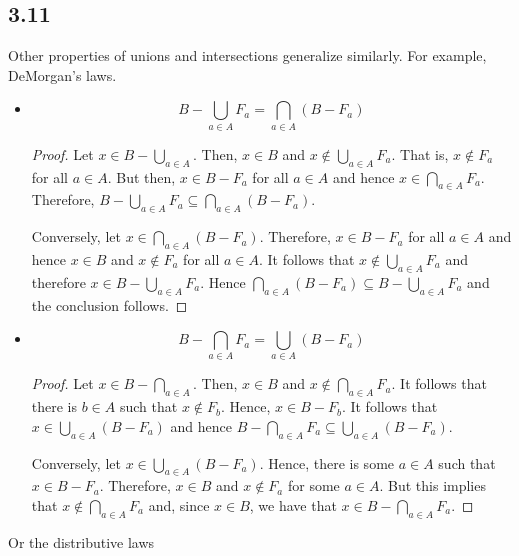 \subsection*{3.11} Other properties of unions and intersections generalize similarly. For example, DeMorgan's laws.

\begin{itemize}
    \item $$B - \bigcup_{a \in A} F_a = \bigcap_{a \in A} ( B - F_a) $$
    
    \begin{proof}
        

    Let $x \in B - \bigcup_{a \in A}$. Then, $x \in B$ and $x \notin \bigcup_{a \in A} F_a$. That is, $x \notin F_a$ for all $a \in A$. But then, $x \in B - F_a$ for all $a \in A$ and hence $x \in \bigcap_{a \in A} F_a$. Therefore, $B - \bigcup_{a \in A} F_a \subseteq \bigcap_{a \in A} ( B - F_a) $.
    
    Conversely, let $x \in \bigcap_{a \in A} ( B - F_a)$. Therefore, $x \in B - F_a$ for all $a \in A$ and hence $x \in B$ and $x \notin F_a$ for all $a \in A$. It follows that $x \notin \bigcup_{a \in A} F_a$ and therefore $x \in B - \bigcup_{a \in A} F_a$. Hence $\bigcap_{a \in A} ( B - F_a) \subseteq B - \bigcup_{a \in A} F_a$ and the conclusion follows.
    \end{proof}
    
    \item $$ B- \bigcap_{a \in A} F_a = \bigcup_{a \in A} (B - F_a)$$
    
    \begin{proof}
        Let $x \in B- \bigcap_{a \in A}$. Then, $x \in B$ and $x \notin \bigcap_{a \in A} F_a$. It follows that there is $b \in A$ such that $x \notin F_b$. Hence, $x \in B - F_b$. It follows that $x \in \bigcup_{a \in A} (B - F_a)$ and hence $ B- \bigcap_{a \in A} F_a \subseteq \bigcup_{a \in A} (B - F_a)$.
        
        Conversely, let $x \in \bigcup_{a \in A} (B - F_a)$. Hence, there is some $a \in A$ such that $x \in B - F_a$. Therefore, $x \in B$ and $x \notin F_a$ for some $a \in A$. But this implies that $x \notin \bigcap_{a \in A} F_a$ and, since $x \in B$, we have that $x \in B - \bigcap_{a \in A} F_a$.
    \end{proof}
        
\end{itemize}

Or the distributive laws

